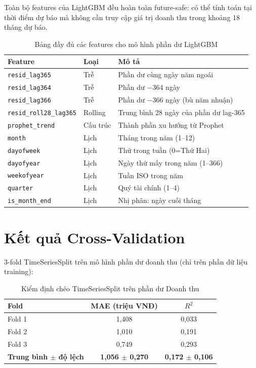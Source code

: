\documentclass{article}
\begin{document}
Toàn bộ features của LightGBM đều hoàn toàn future-safe: có thể tính toán tại thời điểm dự báo mà không cần truy cập giá trị doanh thu trong khoảng 18 tháng dự báo.

\begin{table}[h]
  \caption{Bảng đầy đủ các features cho mô hình phần dư LightGBM}
  \label{tab:features}
  \centering
  \small
  \begin{tabular}{llp{5cm}}
    \toprule
    \textbf{Feature} & \textbf{Loại} & \textbf{Mô tả} \\
    \midrule
    \texttt{resid\_lag365} & Trễ & Phần dư cùng ngày năm ngoái \\
    \texttt{resid\_lag364} & Trễ & Phần dư $-$364 ngày \\
    \texttt{resid\_lag366} & Trễ & Phần dư $-$366 ngày (bù năm nhuận) \\
    \texttt{resid\_roll28\_lag365} & Rolling & Trung bình 28 ngày của phần dư lag-365 \\
    \texttt{prophet\_trend} & Cấu trúc & Thành phần xu hướng từ Prophet \\
    \texttt{month} & Lịch & Tháng trong năm (1--12) \\
    \texttt{dayofweek} & Lịch & Thứ trong tuần (0=Thứ Hai) \\
    \texttt{dayofyear} & Lịch & Ngày thứ mấy trong năm (1--366) \\
    \texttt{weekofyear} & Lịch & Tuần ISO trong năm \\
    \texttt{quarter} & Lịch & Quý tài chính (1--4) \\
    \texttt{is\_month\_end} & Lịch & Nhị phân: ngày cuối tháng \\
    \bottomrule
  \end{tabular}
\end{table}

\section{Kết quả Cross-Validation}

3-fold TimeSeriesSplit trên mô hình phần dư doanh thu (chỉ trên phần dữ liệu training):

\begin{table}[h]
  \caption{Kiểm định chéo TimeSeriesSplit trên phần dư Doanh thu}
  \centering
  \small
  \begin{tabular}{lcc}
    \toprule
    \textbf{Fold} & \textbf{MAE (triệu VNĐ)} & \textbf{$R^2$} \\
    \midrule
    Fold 1 & 1,408 & 0,033 \\
    Fold 2 & 1,010 & 0,191 \\
    Fold 3 & 0,749 & 0,293 \\
    \midrule
    \textbf{Trung bình $\pm$ độ lệch} & \textbf{1,056 $\pm$ 0,270} & \textbf{0,172 $\pm$ 0,106} \\
    \bottomrule
  \end{tabular}
\end{table}
\end{document}
